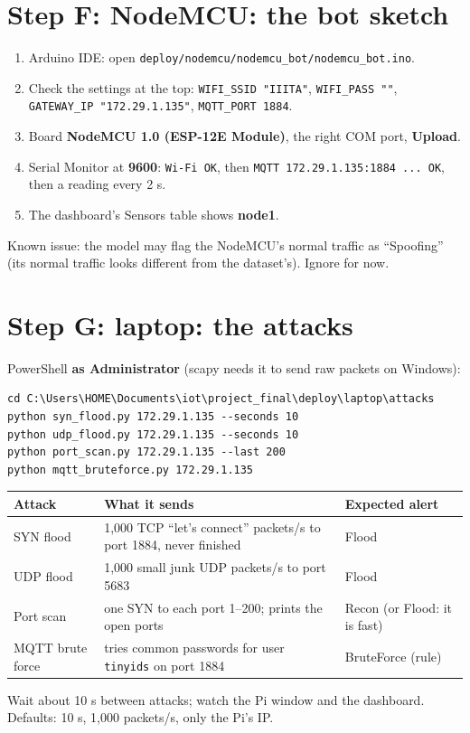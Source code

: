 \documentclass[11pt]{article}
\begin{document}
\section{Step F: NodeMCU: the bot sketch}
\begin{enumerate}
\item Arduino IDE: open \texttt{deploy/nodemcu/nodemcu\_bot/nodemcu\_bot.ino}.
\item Check the settings at the top: \texttt{WIFI\_SSID "IIITA"}, \texttt{WIFI\_PASS ""}, \texttt{GATEWAY\_IP "172.29.1.135"}, \texttt{MQTT\_PORT 1884}.
\item Board \textbf{NodeMCU 1.0 (ESP-12E Module)}, the right COM port, \textbf{Upload}.
\item Serial Monitor at \textbf{9600}: \texttt{Wi-Fi OK}, then \texttt{MQTT 172.29.1.135:1884 ... OK}, then a reading every 2 s.
\item The dashboard's Sensors table shows \textbf{node1}.
\end{enumerate}
Known issue: the model may flag the NodeMCU's normal traffic as ``Spoofing'' (its normal traffic looks different from the dataset's). Ignore for now.

\newpage
\section{Step G: laptop: the attacks}
PowerShell \textbf{as Administrator} (scapy needs it to send raw packets on Windows):
\begin{Verbatim}[frame=single]
cd C:\Users\HOME\Documents\iot\project_final\deploy\laptop\attacks
python syn_flood.py 172.29.1.135 --seconds 10
python udp_flood.py 172.29.1.135 --seconds 10
python port_scan.py 172.29.1.135 --last 200
python mqtt_bruteforce.py 172.29.1.135
\end{Verbatim}
\begin{longtable}{@{}l >{\raggedright}p{7cm} >{\raggedright\arraybackslash}p{5cm}@{}}
\toprule
\textbf{Attack} & \textbf{What it sends} & \textbf{Expected alert} \\
\midrule
\endhead
SYN flood & 1,000 TCP ``let's connect'' packets/s to port 1884, never finished & Flood \\
UDP flood & 1,000 small junk UDP packets/s to port 5683 & Flood \\
Port scan & one SYN to each port 1--200; prints the open ports & Recon (or Flood: it is fast) \\
MQTT brute force & tries common passwords for user \texttt{tinyids} on port 1884 & BruteForce (rule) \\
\bottomrule
\end{longtable}
Wait about 10 s between attacks; watch the Pi window and the dashboard. Defaults: 10 s, 1,000 packets/s, only the Pi's IP.
\end{document}
